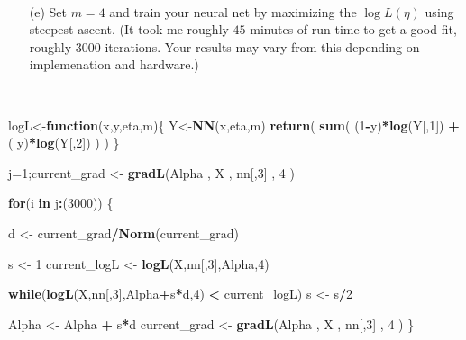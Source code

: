 \documentclass[]{article}
\newenvironment{Shaded}{\begin{snugshade}}{\end{snugshade}}
\newcommand{\KeywordTok}[1]{\textcolor[rgb]{0.13,0.29,0.53}{\textbf{#1}}}
\newcommand{\DecValTok}[1]{\textcolor[rgb]{0.00,0.00,0.81}{#1}}
\newcommand{\StringTok}[1]{\textcolor[rgb]{0.31,0.60,0.02}{#1}}
\newcommand{\ControlFlowTok}[1]{\textcolor[rgb]{0.13,0.29,0.53}{\textbf{#1}}}
\newcommand{\OperatorTok}[1]{\textcolor[rgb]{0.81,0.36,0.00}{\textbf{#1}}}
\newcommand{\NormalTok}[1]{#1}
\begin{document}
~

\begin{itemize} \item[(e)] Set $m=4$ and train your neural net by maximizing the $\log L(\eta)$ using steepest ascent.  (It took me roughly $45$ minutes of run time to get a good fit,  roughly $3000$ iterations.  Your results may vary from this depending on implemenation and hardware.)


 
 \ 
 
 \end{itemize}

\begin{Shaded}
\begin{Highlighting}[]
\NormalTok{logL<-}\ControlFlowTok{function}\NormalTok{(x,y,eta,m)\{}
\NormalTok{    Y<-}\KeywordTok{NN}\NormalTok{(x,eta,m)}
    \KeywordTok{return}\NormalTok{( }\KeywordTok{sum}\NormalTok{( (}\DecValTok{1}\OperatorTok{-}\NormalTok{y)}\OperatorTok{*}\KeywordTok{log}\NormalTok{(Y[,}\DecValTok{1}\NormalTok{]) }\OperatorTok{+}\StringTok{ }\NormalTok{( y)}\OperatorTok{*}\KeywordTok{log}\NormalTok{(Y[,}\DecValTok{2}\NormalTok{])  ) )    \}}

\NormalTok{j=}\DecValTok{1}\NormalTok{;current_grad <-}\StringTok{ }\KeywordTok{gradL}\NormalTok{(Alpha , X , nn[,}\DecValTok{3}\NormalTok{] , }\DecValTok{4}\NormalTok{ ) }

\ControlFlowTok{for}\NormalTok{(i }\ControlFlowTok{in}\NormalTok{ j}\OperatorTok{:}\NormalTok{(}\DecValTok{3000}\NormalTok{)) \{}

\NormalTok{    d <-}\StringTok{ }\NormalTok{current_grad}\OperatorTok{/}\KeywordTok{Norm}\NormalTok{(current_grad)    }
    
\NormalTok{    s <-}\StringTok{ }\DecValTok{1} 
\NormalTok{    current_logL <-}\StringTok{ }\KeywordTok{logL}\NormalTok{(X,nn[,}\DecValTok{3}\NormalTok{],Alpha,}\DecValTok{4}\NormalTok{)}

    \ControlFlowTok{while}\NormalTok{(}\KeywordTok{logL}\NormalTok{(X,nn[,}\DecValTok{3}\NormalTok{],Alpha}\OperatorTok{+}\NormalTok{s}\OperatorTok{*}\NormalTok{d,}\DecValTok{4}\NormalTok{)  }\OperatorTok{<}\StringTok{ }\NormalTok{current_logL)}
\NormalTok{         s <-}\StringTok{ }\NormalTok{s}\OperatorTok{/}\DecValTok{2} 

\NormalTok{  Alpha <-}\StringTok{ }\NormalTok{Alpha }\OperatorTok{+}\StringTok{ }\NormalTok{s}\OperatorTok{*}\NormalTok{d}
\NormalTok{  current_grad <-}\StringTok{  }\KeywordTok{gradL}\NormalTok{(Alpha , X , nn[,}\DecValTok{3}\NormalTok{] , }\DecValTok{4}\NormalTok{ ) \}  }
\end{Highlighting}
\end{Shaded}
\end{document}
